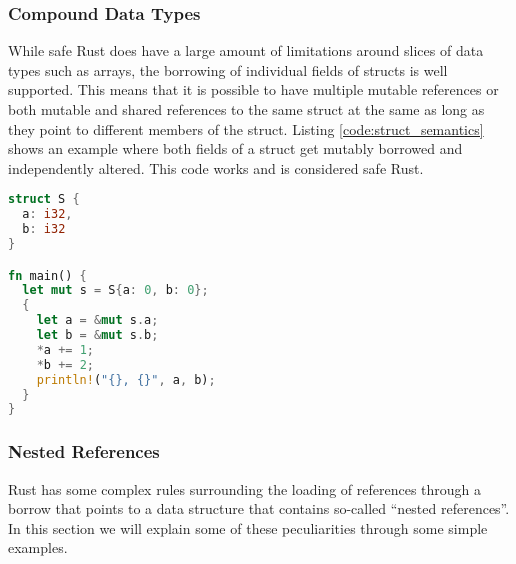 \subsubsection{Compound Data Types}
While safe Rust does have a large amount of limitations around slices of data types such as arrays, the borrowing of individual fields of structs is well supported.
This means that it is possible to have multiple mutable references or both mutable and shared references to the same struct at the same as long as they point to different members of the struct.
Listing \ref{code:struct_semantics} shows an example where both fields of a struct get mutably borrowed and independently altered.
This code works and is considered safe Rust.

\begin{lstlisting}[language=Rust,frame=single,caption=Borrowing struct fields,label=code:struct_semantics]
struct S {
  a: i32,
  b: i32
}

fn main() {
  let mut s = S{a: 0, b: 0};
  {
    let a = &mut s.a;
    let b = &mut s.b;
    *a += 1;
    *b += 2;
    println!("{}, {}", a, b);
  }
}
\end{lstlisting}

\subsubsection{Nested References}
Rust has some complex rules surrounding the loading of references through a borrow that points to a data structure that contains so-called ``nested references''.
In this section we will explain some of these peculiarities through some simple examples.

